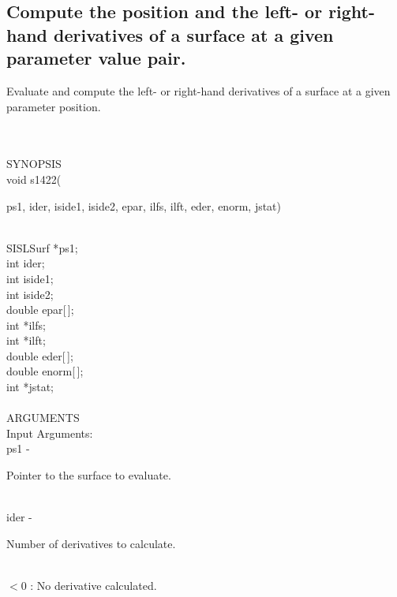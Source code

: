 \subsection{Compute the position and the left- or right-hand derivatives of
a surface at a given parameter value pair.}
\begin{minipg1}
  Evaluate and compute the left- or right-hand derivatives of
  a surface at a given parameter position.
\end{minipg1}\\ \\
SYNOPSIS\\
        \>void s1422(\begin{minipg3}
          {\fov ps1}, {\fov ider}, {\fov iside1}, {\fov iside2}, {\fov epar}, {\fov ilfs}, {\fov ilft}, {\fov eder}, {\fov enorm}, {\fov jstat})
        \end{minipg3}\\[0.3ex]
        \>\>    SISLSurf    \>  *{\fov ps1};\\
        \>\>    int    \>  {\fov ider};\\
        \>\>    int    \>  {\fov iside1};\\
        \>\>    int    \>  {\fov iside2};\\
        \>\>    double \>  {\fov epar}[\,];\\
        \>\>    int    \>  *{\fov ilfs};\\
        \>\>    int    \>  *{\fov ilft};\\
        \>\>    double \>  {\fov eder}[\,];\\
        \>\>    double \>  {\fov enorm}[\,];\\
        \>\>    int    \>  *{\fov jstat};\\
\\
ARGUMENTS\\
        \>Input Arguments:\\
        \>\>    {\fov ps1}\> - \>  \begin{minipg2}
                     Pointer to the surface to evaluate.
                               \end{minipg2}\\
        \>\>    {\fov ider}\> - \>  \begin{minipg2}
                     Number of derivatives to calculate.
                     \end{minipg2}\\
                     \>\>\>\> $<0$ \> : No derivative calculated.\\
